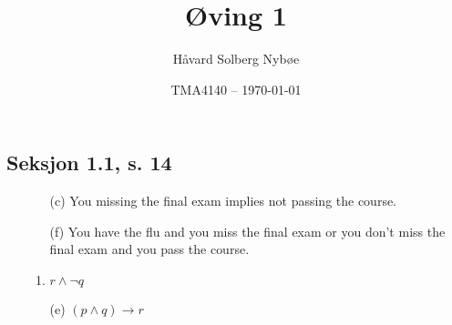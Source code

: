\documentclass[a4paper, 12pt]{article}  %
\title{Øving 1}               %
\author{Håvard Solberg Nybøe}           %
\date{TMA4140 -- \today}                    %
\newcommand{\rarr}{\rightarrow}
\begin{document}
\maketitle

\subsection*{Seksjon 1.1, s. 14}
\begin{enumerate}
    \item [\boxed{14}]
          \begin{enumerate}
              \item [(c)] You missing the final exam implies not passing the course.
              \item [(f)] You have the flu and you miss the final exam or you don't miss the final exam and you pass the course.
          \end{enumerate}
    \item [\boxed{16}]
          \begin{enumerate}
              \item $r \land \neg q$
              \item [(e)] $(p \land q) \rarr r$
          \end{enumerate}
\end{enumerate}
\end{document}

